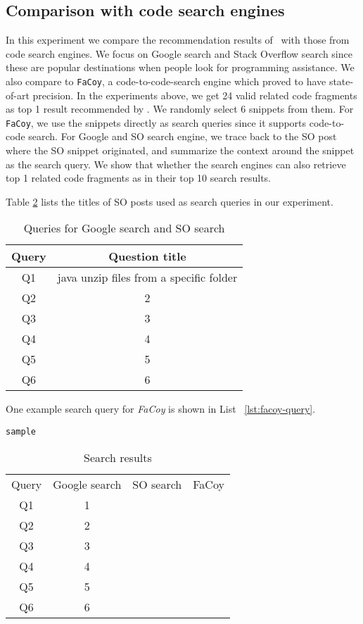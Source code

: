 \subsection{Comparison with code search engines}
In this experiment we compare the recommendation results of \tool\ with those from code search engines. We focus on Google search and Stack Overflow search since these are popular destinations when people look for programming assistance. We also compare to \texttt{FaCoy}, a code-to-code-search engine which proved to have state-of-art precision. In the experiments above, we get 24 valid related code fragments as top 1 result recommended by \tool. We randomly select 6 snippets from them. For \texttt{FaCoy}, we use the snippets directly as search queries since it supports code-to-code search. For Google and SO search engine, we trace back to the SO post where the SO snippet originated, and summarize the context around the snippet as the search query. We show that whether the search engines can also retrieve top 1 related code fragments as \tool in their top 10 search results. 

Table \ref{tab:so-questions} lists the titles of SO posts used as search queries in our experiment.

\begin{table}
	\begin{center}
		\begin{tabular}{ c|c } 
			Query & Question title \\\hline 
			Q1 &  java unzip files from a specific folder\\\hline 
			Q2 &  2 \\ \hline
			Q3 &  3 \\ \hline
			Q4 &  4 \\ \hline
			Q5 &  5 \\ \hline
			Q6 &  6 \\ \hline
		\end{tabular}		
	\end{center}
	\caption{Queries for Google search and SO search}
	\label{tab:so-questions}
\end{table}

One example search query for \textit{FaCoy} is shown in List ~\ref{lst:facoy-query}.
\begin{lstlisting}[label={lst:facoy-query}]
	sample
\end{lstlisting}

\begin{table}
	\begin{center}
		\begin{tabular}{ c|c|c|c } 
			Query & Google search & SO search & FaCoy \\ 
			Q1 &  1  & &\\\hline 
			Q2 &  2 & &\\ \hline
			Q3 &  3 & &\\ \hline
			Q4 &  4 & &\\ \hline
			Q5 &  5 & & \\ \hline
			Q6 &  6 & &\\ \hline
		\end{tabular}		
	\end{center}
	\caption{Search results}
	\label{tab:so-questions}
\end{table}
